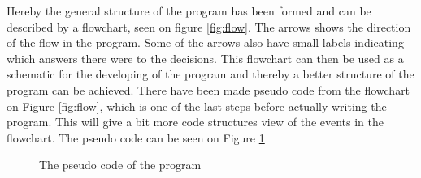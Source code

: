 
Hereby the general structure of the program has been formed and can be described by a flowchart, seen on figure \ref{fig:flow}.
The arrows shows the direction of the flow in the program. Some of the arrows also have small labels indicating which answers there were to the decisions.
This flowchart can then be used as a schematic for the developing of the program and thereby a better structure of the program can be achieved.
There have been made pseudo code from the flowchart on Figure \ref{fig:flow}, which is one of the last steps before actually writing the program. This will give a bit more code structures view of the events in the flowchart. The pseudo code can be seen on Figure \ref{fig:pseudocode}

\begin{figure}[H] \centering
			
\caption{The pseudo code of the program}\label{fig:pseudocode}
\end{figure} 